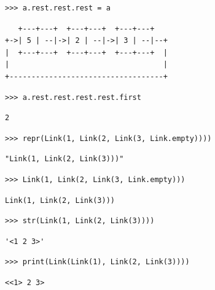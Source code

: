 \begin{blocksection}
\begin{lstlisting}
>>> a.rest.rest.rest = a
\end{lstlisting}
\begin{solution}[0in]
\begin{lstlisting}
   +---+---+  +---+---+  +---+---+
+->| 5 | --|->| 2 | --|->| 3 | --|--+
|  +---+---+  +---+---+  +---+---+  |
|                                   |
+-----------------------------------+
\end{lstlisting}
\end{solution}

\begin{lstlisting}
>>> a.rest.rest.rest.rest.first
\end{lstlisting}
\begin{solution}[.25in]
\begin{lstlisting}
2
\end{lstlisting}
\end{solution}

\begin{lstlisting}
>>> repr(Link(1, Link(2, Link(3, Link.empty))))
\end{lstlisting}
\begin{solution}[.25in]
\begin{lstlisting}
"Link(1, Link(2, Link(3)))"
\end{lstlisting}
\end{solution}

\begin{lstlisting}
>>> Link(1, Link(2, Link(3, Link.empty)))
\end{lstlisting}
\begin{solution}[.25in]
\begin{lstlisting}
Link(1, Link(2, Link(3)))
\end{lstlisting}
\end{solution}

\begin{lstlisting}
>>> str(Link(1, Link(2, Link(3))))
\end{lstlisting}
\begin{solution}[.25in]
\begin{lstlisting}
'<1 2 3>'
\end{lstlisting}
\end{solution}

\begin{lstlisting}
>>> print(Link(Link(1), Link(2, Link(3))))
\end{lstlisting}
\begin{solution}[.25in]
\begin{lstlisting}
<<1> 2 3>
\end{lstlisting}
\end{solution}
\end{blocksection}

